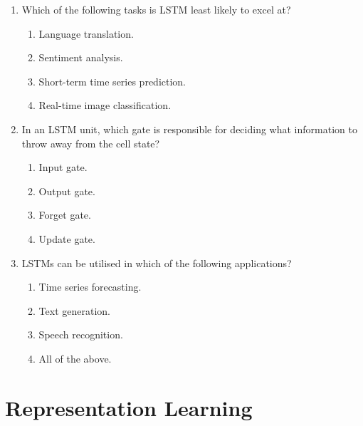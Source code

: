 \documentclass{report}
\numberwithin{equation}{section}
\begin{document}
\begin{enumerate}
\item Which of the following tasks is LSTM least likely to excel at?
\begin{enumerate}[label=\alph*.]
\item Language translation.
\item Sentiment analysis.
\item Short-term time series prediction.
\item Real-time image classification.
\end{enumerate}

\item In an LSTM unit, which gate is responsible for deciding what information to throw away from the cell state?
\begin{enumerate}[label=\alph*.]
\item Input gate.
\item Output gate.
\item Forget gate.
\item Update gate.
\end{enumerate}

\item LSTMs can be utilised in which of the following applications?
\begin{enumerate}[label=\alph*.]
\item Time series forecasting.
\item Text generation.
\item Speech recognition.
\item All of the above.
\end{enumerate}

\end{enumerate}

\section{Representation Learning}
\end{document}
